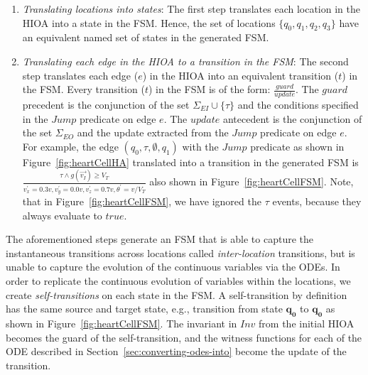 \begin{enumerate}
\item \textit{Translating locations into states}: The first step
  translates each location in the \ac{HIOA} into a state in the
  \ac{FSM}. Hence, the set of locations $\{q_{0}, q_{1}, q_{2}, q_{3}\}$
  have an equivalent named set of states in the generated \ac{FSM}.
\item \textit{Translating each edge in the \ac{HIOA} to a transition in
    the \ac{FSM}}: The second step translates each edge ($e$) in the
  \ac{HIOA} into an equivalent transition ($t$) in the \ac{FSM}. Every
  transition ($t$) in the \ac{FSM} is of the form:
  $\frac{guard}{update}$. The $guard$ precedent is the conjunction of
  the set $\Sigma_{EI} \cup \{\tau\}$ and the conditions specified in
  the $Jump$ predicate on edge $e$. The $update$ antecedent is the
  conjunction of the set $\Sigma_{EO}$ and the update extracted from the $Jump$ 
  predicate on edge $e$. For example, the
  edge $(q_{0}, \tau, \emptyset, q_{1})$ with the $Jump$ predicate as
  shown in Figure~\ref{fig:heartCellHA} translated into a transition in
  the generated \ac{FSM} is
  $\frac{\tau \wedge g(\vec{v_{I}}) \geq V_{T}}{v^{\prime}_{x} = 0.3v,
    v^{\prime}_{y}=0.0v, v^{\prime}_{z}=0.7v, \theta^{\prime}=v/V_{T}}$
  also shown in Figure~\ref{fig:heartCellFSM}. Note, that in
  Figure~\ref{fig:heartCellFSM}, we have ignored the $\tau$ events,
  because they always evaluate to $true$.

\end{enumerate}


The aforementioned steps generate an \ac{FSM} that is able to capture
the instantaneous transitions across locations called
\textit{inter-location} transitions, but is unable to capture the
evolution of the continuous variables via the \acp{ODE}. In order to
replicate the continuous evolution of variables within the locations, we
create \textit{self-transitions} on each state in the \ac{FSM}. A
self-transition by definition has the same source and target state,
e.g., transition from state $\mathbf{q_{0}}$ to $\mathbf{q_{0}}$ as shown in
Figure~\ref{fig:heartCellFSM}. The invariant in $Inv$ from the initial
\ac{HIOA} becomes the guard of the self-transition, and the witness
functions for each of the \acs{ODE} described in
Section~\ref{sec:converting-odes-into} become the update of the
transition.

